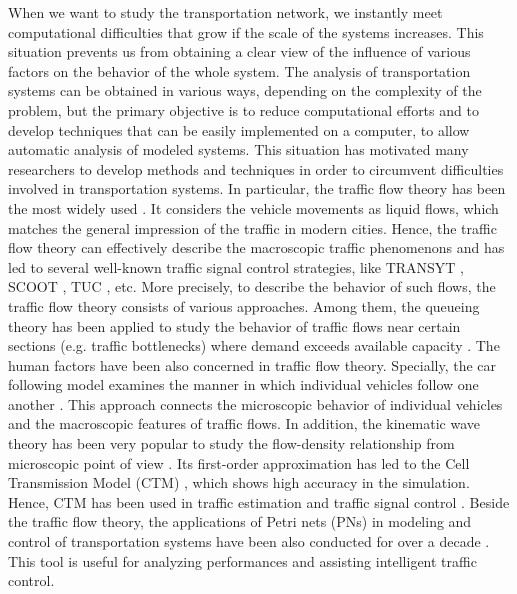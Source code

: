 \documentclass[preprint,authoryear,12pt]{elsarticle}
\begin{document}
When we want to study the transportation network, we instantly meet
computational difficulties that grow if the scale of the systems
increases. This situation prevents us from obtaining a clear view of
the influence of various factors on the behavior of the whole system.
The analysis of transportation systems can be obtained in various
ways, depending on the complexity of the problem, but the primary
objective is to reduce computational efforts and to develop
techniques that can be easily implemented on a computer, to allow
automatic analysis of modeled systems. This situation has motivated
many researchers to develop methods and techniques in order to
circumvent difficulties involved in transportation systems. In
particular, the traffic flow theory has been the most widely used
\citep{nathan_h_gartner_revised_2005}. It considers the vehicle
movements as liquid flows, which matches the general impression of
the traffic in modern cities. Hence, the traffic flow theory can
effectively describe the macroscopic traffic phenomenons and has led
to several well-known traffic signal control strategies, like TRANSYT
\citep{hale_traffic_2005}, SCOOT \citep{bretherton_r_d_scoot_1982},
TUC \citep{diakaki_multivariable_2002,papageorgiou_review_2003}, etc.
More precisely, to describe the behavior of such flows, the traffic
flow theory consists of various approaches. Among them, the queueing
theory has been applied to study the behavior of traffic flows near
certain sections (e.g. traffic bottlenecks) where demand exceeds
available capacity \citep{Vandaele2000}. The human factors have been
also concerned in traffic flow theory. Specially, the car following
model examines the manner in which individual vehicles follow one
another \citep{Gipps1981,Zhao2005}. This approach connects the
microscopic behavior of individual vehicles and the macroscopic
features of traffic flows. In addition, the kinematic wave theory has
been very popular to study the flow-density relationship from
microscopic point of view
\citep{zhang_kinematic_2002,jin_multicommodity_2004}. Its first-order
approximation has led to the Cell Transmission Model (CTM)
\citep{daganzo_cell_1995}, which shows high accuracy in the
simulation. Hence, CTM has been used in traffic estimation
\citep{CanudasdeWit2012} and traffic signal control
\citep{Pohlmann2010}. Beside the traffic flow theory, the
applications of Petri nets (PNs) in modeling and control of
transportation systems have been also conducted for over a decade
\citep{ng_review_2013}. This tool is useful for analyzing
performances and assisting intelligent traffic control.
\end{document}
